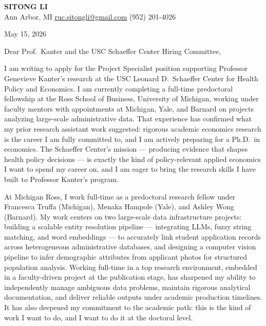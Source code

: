 \documentclass[12pt]{article}
\begin{document}
\begin{center}
  {\LARGE\textbf{\textcolor{accent}{SITONG LI}}} \\[4pt]
  \small Ann Arbor, MI
  \;\textbullet\;
  \href{mailto:ruc.sitongli@gmail.com}{ruc.sitongli@gmail.com}
  \;\textbullet\;
  (952) 201-4026
\end{center}

\vspace{1em}

\noindent May 15, 2026

\vspace{1em}

\noindent Dear Prof.\ Kanter and the USC Schaeffer Center Hiring Committee,

\vspace{1em}

I am writing to apply for the Project Specialist position supporting Professor Genevieve Kanter's research at the USC Leonard D.\ Schaeffer Center for Health Policy and Economics. I am currently completing a full-time predoctoral fellowship at the Ross School of Business, University of Michigan, working under faculty mentors with appointments at Michigan, Yale, and Barnard on projects analyzing large-scale administrative data. That experience has confirmed what my prior research assistant work suggested: rigorous academic economics research is the career I am fully committed to, and I am actively preparing for a Ph.D.\ in economics. The Schaeffer Center's mission --- producing evidence that shapes health policy decisions --- is exactly the kind of policy-relevant applied economics I want to spend my career on, and I am eager to bring the research skills I have built to Professor Kanter's program.

At Michigan Ross, I work full-time as a predoctoral research fellow under Francesca Truffa (Michigan), Menaka Hampole (Yale), and Ashley Wong (Barnard). My work centers on two large-scale data infrastructure projects: building a scalable entity resolution pipeline --- integrating LLMs, fuzzy string matching, and word embeddings --- to accurately link student application records across heterogeneous administrative databases, and designing a computer vision pipeline to infer demographic attributes from applicant photos for structured population analysis. Working full-time in a top research environment, embedded in a faculty-driven project at the publication stage, has sharpened my ability to independently manage ambiguous data problems, maintain rigorous analytical documentation, and deliver reliable outputs under academic production timelines. It has also deepened my commitment to the academic path: this is the kind of work I want to do, and I want to do it at the doctoral level.
\end{document}
